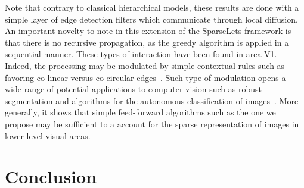 \documentclass[a4paper, 11pt]{book}
\begin{document}
%
Note that contrary to classical hierarchical models,
these results are done with a simple layer of edge detection filters which communicate through local diffusion.
An important novelty to note in this extension of the SparseLets framework is that there is no recursive propagation, as the greedy algorithm is applied in a sequential manner.
These types of interaction have been found in area V1.
Indeed, the processing may be modulated by simple contextual rules
such as favoring co-linear versus co-circular edges~\citep{McManus11}.
Such type of modulation opens a wide range of potential applications to computer vision such as robust segmentation and algorithms for the autonomous classification of images~\citep{PerrinetBednar15}.
More generally, it shows that simple feed-forward algorithms such as the one we propose may be sufficient to a	account for the sparse representation of images in lower-level visual areas.

\section{Conclusion}

%
%
\end{document}
